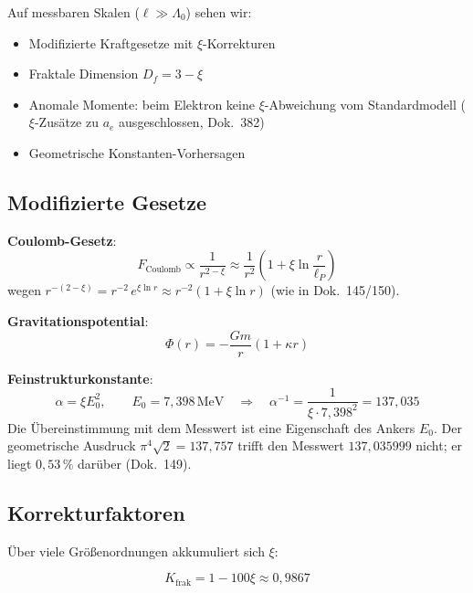 \begin{keyresult}
Auf messbaren Skalen ($\ell \gg \Lambda_0$) sehen wir:

\begin{itemize}
\item Modifizierte Kraftgesetze mit $\xi$-Korrekturen
\item Fraktale Dimension $D_f = 3-\xi$
\item Anomale Momente: beim Elektron keine $\xi$-Abweichung vom Standardmodell ($\xi$-Zusätze zu $a_e$ ausgeschlossen, Dok.~382)
\item Geometrische Konstanten-Vorhersagen
\end{itemize}
\end{keyresult}

\subsection{Modifizierte Gesetze}

\textbf{Coulomb-Gesetz}:
\begin{equation}
F_{\text{Coulomb}} \propto \frac{1}{r^{2-\xi}} \approx \frac{1}{r^2} \left(1 + \xi \ln\frac{r}{\ell_P}\right)
\end{equation}
wegen $r^{-(2-\xi)} = r^{-2}\,e^{\xi \ln r} \approx r^{-2}(1 + \xi \ln r)$ (wie in Dok.~145/150).

\textbf{Gravitationspotential}:
\begin{equation}
\Phi(r) = -\frac{Gm}{r}(1 + \kappa r)
\end{equation}

\textbf{Feinstrukturkonstante}:
\begin{equation}
\alpha = \xi E_0^2, \qquad E_0 = 7{,}398\,\text{MeV} \quad \Rightarrow \quad \alpha^{-1} = \frac{1}{\xi \cdot 7{,}398^2} = 137{,}035
\end{equation}
Die Übereinstimmung mit dem Messwert ist eine Eigenschaft des Ankers $E_0$. Der geometrische Ausdruck $\pi^4\sqrt{2} = 137{,}757$ trifft den Messwert $137{,}035999$ nicht; er liegt $0{,}53\,\%$ darüber (Dok.~149).

\subsection{Korrekturfaktoren}

Über viele Größenordnungen akkumuliert sich $\xi$:

\begin{equation}
K_{\text{frak}} = 1 - 100\xi \approx 0{,}9867
\end{equation}

